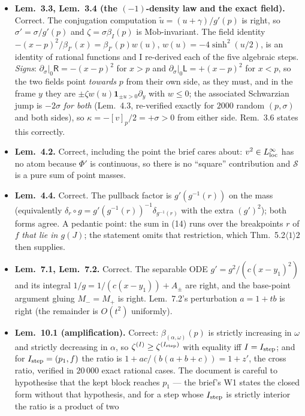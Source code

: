 \documentclass[11pt]{article}
\newcommand{\Sch}{\mathcal S}
\newcommand{\Mob}{\operatorname{M\ddot ob}}
\newcommand{\bI}{\beta_I}
\newcommand{\Rp}{\mathsf R}
\newcommand{\Lp}{\mathsf L}
\theoremstyle{definition}\newtheorem{example}[theorem]{Example}
\begin{document}
\begin{itemize}[leftmargin=1.4em]
\item \textbf{Lem.~3.3, Lem.~3.4 (the $(-1)$-density law and the exact field).}  Correct.
 The conjugation computation $\tilde u=(u+\gamma)/g'(p)$ is right, so
 $\sigma'=\sigma/g'(p)$ and $\zeta=\sigma\bI(p)$ is $\Mob$-invariant.  The field identity
 $-(x-p)^2/\beta_{I'}(x)=\beta_{I'}(p)w(u)$, $w(u)=-4\sinh^2(u/2)$, is an identity of
 rational functions and I re-derived each of the five algebraic steps.  \emph{Signs}:
 $\partial_\sigma|_0\Rp=-(x-p)^2$ for $x>p$ and $\partial_\sigma|_0\Lp=+(x-p)^2$ for
 $x<p$, so the two fields point \emph{towards} $p$ from their own side, as they must, and
 in the frame $y$ they are $\pm\zeta w(u)\mathbf 1_{\pm u>0}\partial_y$ with
 $w\le0$; the associated Schwarzian jump is $-2\sigma$ \emph{for both}
 (Lem.~4.3, re-verified exactly for $2000$ random $(p,\sigma)$ and both sides), so
 $\kappa=-[v]_p/2=+\sigma>0$ from either side.  Rem.~3.6 states this correctly.
\item \textbf{Lem.~4.2.}  Correct, including the point the brief cares about: $v^2\in
 L^\infty_{\rm loc}$ has no atom because $\Phi'$ is continuous, so there is no ``square''
 contribution and $\Sch$ is a pure sum of point masses.
\item \textbf{Lem.~4.4.}  Correct.  The pullback factor is $g'(g^{-1}(r))$ on the mass
 (equivalently $\delta_r\circ g=g'(g^{-1}(r))^{-1}\delta_{g^{-1}(r)}$ with the extra
 $(g')^2$); both forms agree.  A pedantic point: the sum in (14) runs over the breakpoints
 $r$ of $f$ \emph{that lie in $g(J)$}; the statement omits that restriction, which
 Thm.~5.2$\langle1\rangle2$ then supplies.
\item \textbf{Lem.~7.1, Lem.~7.2.}  Correct.  The separable ODE $g'=g^2/(c(x-y_1)^2)$ and
 its integral $1/g=1/(c(x-y_1))+A_\pm$ are right, and the base-point argument gluing
 $M_-=M_+$ is right.  Lem.~7.2's perturbation $a=1+tb$ is right (the remainder is
 $O(t^2)$ uniformly).
\item \textbf{Lem.~10.1 (amplification).}  Correct: $\beta_{(\alpha,\omega)}(p)$ is
 strictly increasing in $\omega$ and strictly decreasing in $\alpha$, so
 $\zeta^{(I)}\ge\zeta^{(I_{\rm step})}$ with equality iff $I=I_{\rm step}$; and for
 $I_{\rm step}=(p_1,f)$ the ratio is $1+ac/(b(a+b+c))=1+z'$, the cross ratio, verified in
 $20\,000$ exact rational cases.  The document is careful to hypothesise that the kept
 block reaches $p_1$ --- the brief's W1 states the closed form without that hypothesis,
 and for a step whose $I_{\rm step}$ is strictly interior the ratio is a product of two

\end{itemize}
\end{document}
